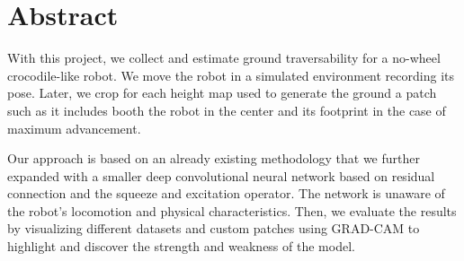 \documentclass[../document.tex]{subfiles}
\begin{document}
\section{Abstract}
With this project, we collect and estimate ground traversability for a no-wheel crocodile-like robot. We move the robot in a simulated environment recording its pose. Later, we crop for each height map used to generate the ground a patch such as it includes 
booth the robot in the center and its footprint in the case of maximum advancement.

Our approach is based on 
an already existing methodology that we further expanded with a smaller deep convolutional neural network based on residual connection and the squeeze and excitation operator.
The network is unaware of the robot's locomotion and physical characteristics. 
Then, we evaluate the results by visualizing different datasets and custom patches using GRAD-CAM to highlight and discover the strength and weakness of the model.
\end{document}
